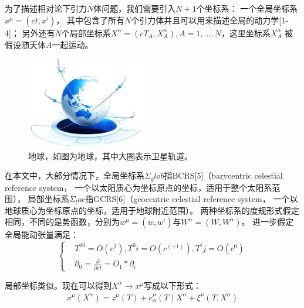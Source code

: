 \documentclass{ctexart}
\begin{document}
\par 为了描述相对论下引力$N$体问题，我们需要引入$N+1$个坐标系：
一个全局坐标系$x^\mu=(ct,x^i)$，
其中包含了所有$N$个引力体并且可以用来描述全局的动力学[1-4]；
另外还有$N$个局部坐标系$X^\alpha=(cT_A,X_A^α),A=1,...,N$，这里坐标系$X_A^\alpha$
被假设随天体$A$一起运动。
\par \begin{figure}
  \vspace{-20pt}
  \begin{center}
    \includegraphics[width=0.48\textwidth]{Sphere.png}
  \end{center}
  \vspace{-20pt}
  \caption{地球，如图为地球，其中大圈表示卫星轨道。}
  \vspace{-10pt}
\end{figure}
在本文中，大部分情况下，全局坐标系$\Sigma_glob$指BCRS[5]（barycentric celestial reference system，
一个以太阳质心为坐标原点的坐标，适用于整个太阳系范围），
局部坐标系$\Sigma_loc$指GCRS[6]（geocentric celestial reference system，
一个以地球质心为坐标原点的坐标，适用于地球附近范围）。
两种坐标系的度规形式假定相同，不同的是势函数，分别为$w^\mu=(w,w^i )与W^\alpha=(W,W^\alpha)$。
进一步假定全局能动张量满足：
\begin{equation}
   \left\{
   \begin{aligned}
   &T^00=O(c^2),T^0i=O(c^(+1)),T^ij=O(c^0) \\
   &\partial_0=\frac{\partial}{\partial ct}=O_1*\partial_i
   \end{aligned}
   \right.
\end{equation}
\par 局部坐标类似。现在可以得到$X^\alpha \rightarrow x^\mu$写成以下形式：
\begin{equation}
  \begin{aligned}
   x^\mu(X^\alpha )=z^\mu (T)+e_\alpha^\mu (T) X^\alpha+\xi^\mu (T,X^\alpha)
  \end{aligned}
\end{equation}
\end{document}
